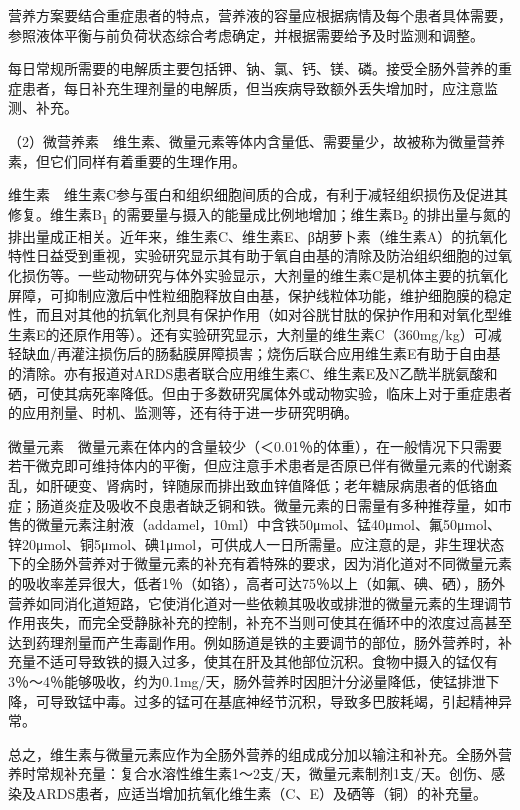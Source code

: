 营养方案要结合重症患者的特点，营养液的容量应根据病情及每个患者具体需要，参照液体平衡与前负荷状态综合考虑确定，并根据需要给予及时监测和调整。

每日常规所需要的电解质主要包括钾、钠、氯、钙、镁、磷。接受全肠外营养的重症患者，每日补充生理剂量的电解质，但当疾病导致额外丢失增加时，应注意监测、补充。

（2）微营养素　维生素、微量元素等体内含量低、需要量少，故被称为微量营养素，但它们同样有着重要的生理作用。

维生素　维生素C参与蛋白和组织细胞间质的合成，有利于减轻组织损伤及促进其修复。维生素B\textsubscript{1}
的需要量与摄入的能量成比例地增加；维生素B\textsubscript{2}
的排出量与氮的排出量成正相关。近年来，维生素C、维生素E、β胡萝卜素（维生素A）的抗氧化特性日益受到重视，实验研究显示其有助于氧自由基的清除及防治组织细胞的过氧化损伤等。一些动物研究与体外实验显示，大剂量的维生素C是机体主要的抗氧化屏障，可抑制应激后中性粒细胞释放自由基，保护线粒体功能，维护细胞膜的稳定性，而且对其他的抗氧化剂具有保护作用（如对谷胱甘肽的保护作用和对氧化型维生素E的还原作用等）。还有实验研究显示，大剂量的维生素C（360mg/kg）可减轻缺血/再灌注损伤后的肠黏膜屏障损害；烧伤后联合应用维生素E有助于自由基的清除。亦有报道对ARDS患者联合应用维生素C、维生素E及N乙酰半胱氨酸和硒，可使其病死率降低。但由于多数研究属体外或动物实验，临床上对于重症患者的应用剂量、时机、监测等，还有待于进一步研究明确。

微量元素　微量元素在体内的含量较少（＜0.01％的体重），在一般情况下只需要若干微克即可维持体内的平衡，但应注意手术患者是否原已伴有微量元素的代谢紊乱，如肝硬变、肾病时，锌随尿而排出致血锌值降低；老年糖尿病患者的低铬血症；肠道炎症及吸收不良患者缺乏铜和铁。微量元素的日需量有多种推荐量，如市售的微量元素注射液（addamel，10ml）中含铁50μmol、锰40μmol、氟50μmol、锌20μmol、铜5μmol、碘1μmol，可供成人一日所需量。应注意的是，非生理状态下的全肠外营养对于微量元素的补充有着特殊的要求，因为消化道对不同微量元素的吸收率差异很大，低者1％（如铬），高者可达75％以上（如氟、碘、硒），肠外营养如同消化道短路，它使消化道对一些依赖其吸收或排泄的微量元素的生理调节作用丧失，而完全受静脉补充的控制，补充不当则可使其在循环中的浓度过高甚至达到药理剂量而产生毒副作用。例如肠道是铁的主要调节的部位，肠外营养时，补充量不适可导致铁的摄入过多，使其在肝及其他部位沉积。食物中摄入的锰仅有3％～4％能够吸收，约为0.1mg/天，肠外营养时因胆汁分泌量降低，使锰排泄下降，可导致锰中毒。过多的锰可在基底神经节沉积，导致多巴胺耗竭，引起精神异常。

总之，维生素与微量元素应作为全肠外营养的组成成分加以输注和补充。全肠外营养时常规补充量：复合水溶性维生素1～2支/天，微量元素制剂1支/天。创伤、感染及ARDS患者，应适当增加抗氧化维生素（C、E）及硒等（铜）的补充量。

